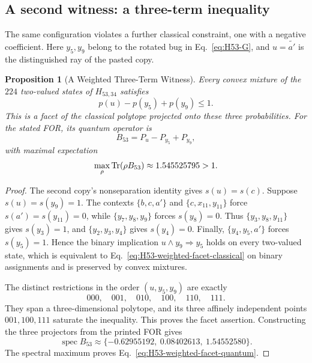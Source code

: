 \documentclass[aps,pra,reprint,superscriptaddress,longbibliography,nofootinbib,floatfix,10pt]{revtex4-2}
\newtheorem{proposition}[theorem]{Proposition}
\theoremstyle{definition}\newtheorem{definition}[theorem]{Definition}
\theoremstyle{remark}\newtheorem{remark}[theorem]{Remark}
\begin{document}
\subsection{A second witness: a three-term inequality}\label{sec:H53-weighted-facet}
The same configuration violates a further classical constraint, one with a negative coefficient. Here $y_5,y_9$ belong to the rotated bug in Eq.~\eqref{eq:H53-G}, and $u=\widetilde{a'}$ is the distinguished ray of the pasted copy.

\begin{proposition}[A Weighted Three-Term Witness]\label{prop:H53-weighted-facet}
Every convex mixture of the $224$ two-valued states of $H_{53,34}$ satisfies
\begin{equation}\label{eq:H53-weighted-facet-classical}
\boxed{p(u)-p(y_5)+p(y_9)\le1.}
\end{equation}
This is a facet of the classical polytope projected onto these three probabilities. For the stated FOR, its quantum operator is
\begin{equation}\label{eq:H53-weighted-facet-operator}
B_{53}=P_u-P_{y_5}+P_{y_9},
\end{equation}
with maximal expectation
\begin{equation}\label{eq:H53-weighted-facet-quantum}
\max_\rho\operatorname{Tr}(\rho B_{53})\approx1.545525795>1.
\end{equation}
\end{proposition}
\begin{proof}
The second copy's nonseparation identity gives $s(u)=s(c)$. Suppose $s(u)=s(y_9)=1$. The contexts $\{b,c,a'\}$ and $\{c,x_{11},y_{11}\}$ force $s(a')=s(y_{11})=0$, while $\{y_7,y_8,y_9\}$ forces $s(y_8)=0$. Thus $\{y_3,y_8,y_{11}\}$ gives $s(y_3)=1$, and $\{y_2,y_3,y_4\}$ gives $s(y_4)=0$. Finally, $\{y_4,y_5,a'\}$ forces $s(y_5)=1$. Hence the binary implication $u\wedge y_9\Rightarrow y_5$ holds on every two-valued state, which is equivalent to Eq.~\eqref{eq:H53-weighted-facet-classical} on binary assignments and is preserved by convex mixtures.

The distinct restrictions in the order $(u,y_5,y_9)$ are exactly
\[
000,\quad001,\quad010,\quad100,\quad110,\quad111.
\]
They span a three-dimensional polytope, and its three affinely independent points $001,100,111$ saturate the inequality. This proves the facet assertion. Constructing the three projectors from the printed FOR gives
\begin{equation}\label{eq:H53-weighted-facet-spectrum}
\operatorname{spec}B_{53}\approx
\{-0.62955192,\ 0.08402613,\ 1.54552580\}.
\end{equation}
The spectral maximum proves Eq.~\eqref{eq:H53-weighted-facet-quantum}.
\end{proof}
\end{document}
